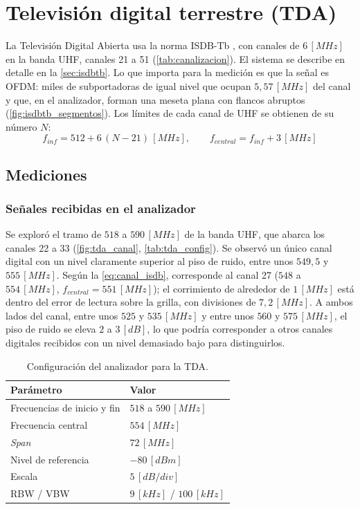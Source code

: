 \section{Televisión digital terrestre (TDA)}
\label{sec:tda}

La Televisión Digital Abierta usa la norma ISDB-Tb \cite{decreto1148}, con canales de $6 \, [MHz]$ en la banda UHF, canales 21 a 51 (\autoref{tab:canalizacion}). El sistema se describe en detalle en la \autoref{sec:isdbtb}. Lo que importa para la medición es que la señal es OFDM: miles de subportadoras de igual nivel que ocupan $5{,}57 \, [MHz]$ del canal y que, en el analizador, forman una meseta plana con flancos abruptos (\autoref{fig:isdbtb_segmentos}). Los límites de cada canal de UHF se obtienen de su número $N$:
\begin{equation}
    f_{inf} = 512 + 6 \, (N - 21) \, [MHz], \qquad f_{central} = f_{inf} + 3 \, [MHz]
    \label{eq:canal_isdb}
\end{equation}

\subsection{Mediciones}

\subsubsection*{Señales recibidas en el analizador}
Se exploró el tramo de $518$ a $590 \, [MHz]$ de la banda UHF, que abarca los canales 22 a 33 (\autoref{fig:tda_canal}, \autoref{tab:tda_config}). Se observó un único canal digital con un nivel claramente superior al piso de ruido, entre unos $549{,}5$ y $555 \, [MHz]$. Según la \autoref{eq:canal_isdb}, corresponde al canal 27 ($548$ a $554 \, [MHz]$, $f_{central} = 551 \, [MHz]$); el corrimiento de alrededor de $1 \, [MHz]$ está dentro del error de lectura sobre la grilla, con divisiones de $7{,}2 \, [MHz]$. A ambos lados del canal, entre unos $525$ y $535 \, [MHz]$ y entre unos $560$ y $575 \, [MHz]$, el piso de ruido se eleva $2$ a $3 \, [dB]$, lo que podría corresponder a otros canales digitales recibidos con un nivel demasiado bajo para distinguirlos.

\begin{table}[H]
    \centering
    \caption{Configuración del analizador para la TDA.}
    \label{tab:tda_config}
    \begin{tabular}{p{8.5cm} >{\raggedright\arraybackslash}p{5.8cm}}
        \toprule
        \textbf{Parámetro} & \textbf{Valor} \\
        \midrule
        Frecuencias de inicio y fin & $518$ a $590 \, [MHz]$ \\
        Frecuencia central & $554 \, [MHz]$\\
        \textit{Span} & $72 \, [MHz]$ \\
        Nivel de referencia & $-80 \, [dBm]$ \\
        Escala &  $5 \, [dB/div]$ \\
        RBW / VBW & $9 \, [kHz]$ / $100 \, [kHz]$ \\
        \bottomrule
    \end{tabular}
\end{table}

